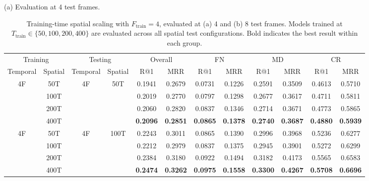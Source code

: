 \begin{table}[t]
    \centering
    \caption{Training-time spatial scaling with $F_{\text{train}}=4$, evaluated at (a) 4 and (b) 8 test frames. Models trained at $T_{\text{train}} \in \{50, 100, 200, 400\}$ are evaluated across all spatial test configurations. Bold indicates the best result within each group.}
    \label{mglvr:tab:train_spatial_scaling}
    \footnotesize
    \renewcommand{\arraystretch}{0.94}
    (a) Evaluation at 4 test frames.\par\smallskip
    \begin{tabular}{@{}c@{\hspace{3pt}}c@{\hspace{6pt}}c@{\hspace{3pt}}c@{\hspace{6pt}}*{7}{c@{\hspace{3pt}}}c@{}}
\toprule
\multicolumn{2}{c|}{Training} & \multicolumn{2}{c|}{Testing} & \multicolumn{2}{c|}{Overall} & \multicolumn{2}{c|}{FN} & \multicolumn{2}{c|}{MD} & \multicolumn{2}{c}{CR} \\
Temporal & Spatial & Temporal & Spatial & R@1   & MRR   & R@1   & MRR   & R@1   & MRR   & R@1   & MRR \\
\midrule
\multirow{4}{*}{4F} & 50T & \multirow{4}{*}{4F} & \multirow{4}{*}{50T}  & 0.1941 & 0.2679 & 0.0731 & 0.1226 & 0.2591 & 0.3509 & 0.4613 & 0.5710 \\
& 100T & & & 0.2019 & 0.2770 & 0.0797 & 0.1298 & 0.2677 & 0.3617 & 0.4711 & 0.5811 \\
& 200T & & & 0.2060 & 0.2820 & 0.0837 & 0.1346 & 0.2714 & 0.3671 & 0.4773 & 0.5865 \\
& 400T & & & \textbf{0.2096} & \textbf{0.2851} & \textbf{0.0865} & \textbf{0.1378} & \textbf{0.2740} & \textbf{0.3687} & \textbf{0.4880} & \textbf{0.5939} \\
\midrule
\multirow{4}{*}{4F} & 50T & \multirow{4}{*}{4F} & \multirow{4}{*}{100T} & 0.2243 & 0.3011 & 0.0865 & 0.1390 & 0.2996 & 0.3968 & 0.5236 & 0.6277 \\
& 100T & & & 0.2212 & 0.2979 & 0.0837 & 0.1375 & 0.2945 & 0.3901 & 0.5272 & 0.6299 \\
& 200T & & & 0.2384 & 0.3180 & 0.0922 & 0.1494 & 0.3182 & 0.4173 & 0.5565 & 0.6583 \\
& 400T & & & \textbf{0.2474} & \textbf{0.3262} & \textbf{0.0975} & \textbf{0.1558} & \textbf{0.3300} & \textbf{0.4267} & \textbf{0.5708} & \textbf{0.6696} \\

\end{tabular}
\end{table}

